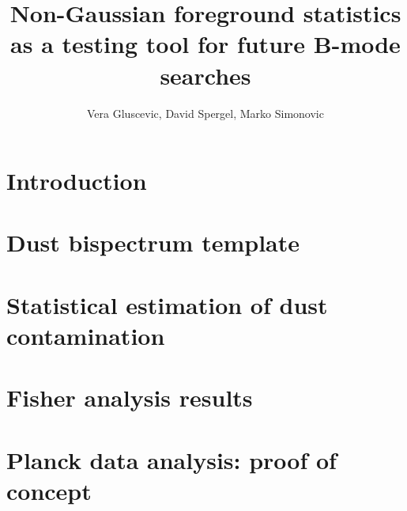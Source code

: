 \documentclass[a4paper, traditabstract,longauth]{aa}
\begin{document}
%
\title{Non-Gaussian foreground statistics as a testing tool for future B-mode searches}

\author{Vera Gluscevic, David Spergel, Marko Simonovic}



%


\maketitle

\section {Introduction}
\label{intro}



\section{Dust bispectrum template}
\label{sec:template}



\section{Statistical estimation of dust contamination}
\label{sec:contamination}



\section{Fisher analysis results}
\label{sec:results}



\section{Planck data analysis: proof of concept}
\label{sec:proof}


\end{document}
